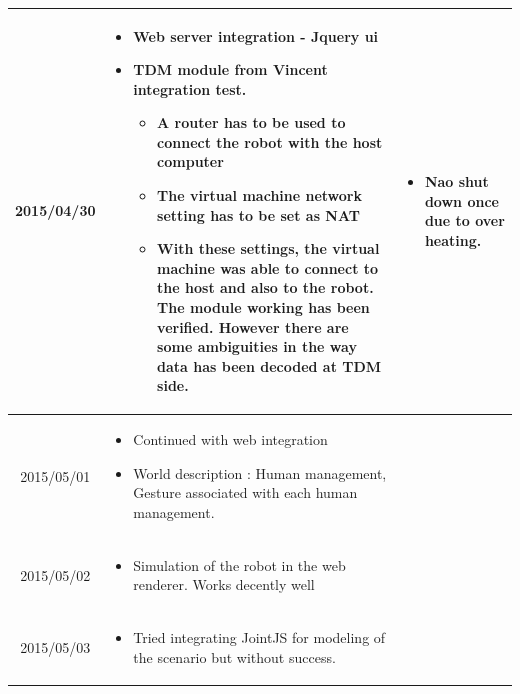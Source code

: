 \documentclass[11pt]{article} %
\begin{document}
\begin{center}
\begin{longtable}{ | c | p{6cm} | p{5cm} |}
  2015/04/30         & 
  \begin{itemize}
  \item Web server integration - Jquery ui
  \item TDM module from Vincent integration test. 
  \begin{itemize}
  	\item A router has to be used to connect the robot with the host computer
  	\item The virtual machine network setting has to be set as NAT
  	\item With these settings, the virtual machine was able to connect to the host and also to the robot. The module working has been verified. However there are some ambiguities in the way data has been decoded at TDM side.
  \end{itemize}
\end{itemize}   
  & 
  \begin{itemize}
  \item Nao shut down once due to over heating.
  \end{itemize}
\\  										 \hline

  2015/05/01         & 
  \begin{itemize}
  \item Continued with web integration
  \item World description : Human management, Gesture associated with each human management.
\end{itemize}   
  & 
\\
  										 \hline
  										 
	 2015/05/02         & 
  \begin{itemize}
  \item Simulation of the robot in the web renderer. Works decently well
  \end{itemize}
  & 
		\\					 \hline  	

	 2015/05/03         & 
  \begin{itemize}
  \item Tried integrating JointJS for modeling of the scenario but without success.
\end{itemize}   
  & 
		\\					 \hline  	
										 
  										   								 
    \end{longtable}
\end{center}
\end{document}
